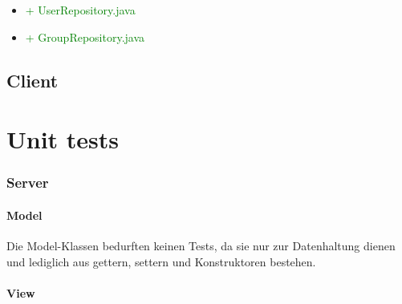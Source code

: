 \documentclass[a4paper]{scrreprt}
\begin{document}
\begin{itemize}
\item\textcolor{green}{+ UserRepository.java}
\item\textcolor{green}{+ GroupRepository.java}
\end{itemize}


\section{Client}


\chapter{Unit tests}
\subsection{Server}

\subsubsection{Model}
Die Model-Klassen bedurften keinen Tests, da sie nur zur Datenhaltung dienen und lediglich aus gettern, settern und Konstruktoren bestehen.

\subsubsection{View}
\end{document}
